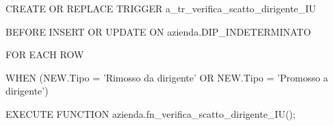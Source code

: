         \ttfamily
            \begin{flushleft}
                \begin{description}
                    \item CREATE OR REPLACE TRIGGER a\_tr\_verifica\_scatto\_dirigente\_IU
                    \item BEFORE INSERT OR UPDATE ON azienda.DIP\_INDETERMINATO
                    \item FOR EACH ROW
                    \item WHEN (NEW.Tipo = 'Rimosso da dirigente' OR NEW.Tipo = 'Promosso a dirigente')
                    \item EXECUTE FUNCTION azienda.fn\_verifica\_scatto\_dirigente\_IU();
                \end{description}
            \end{flushleft}
        \normalfont



